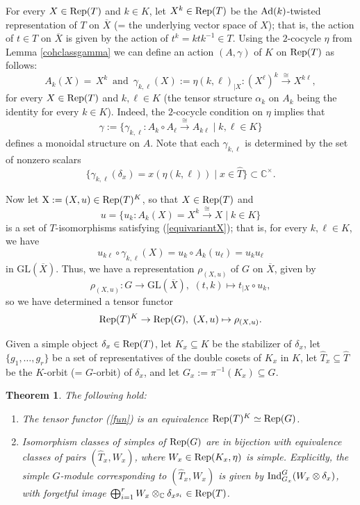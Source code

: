 \documentclass{amsart}
\newtheorem{theorem}{Theorem}[section]
\theoremstyle{definition}
\newcommand{\Ad}{{\rm Ad}}
\newcommand{\Rep}{{\rm Rep}}
\newcommand{\ot}{\otimes}
\newcommand{\GL}{{\text{GL}}}
\numberwithin{equation}{section}
\begin{document}
For every $X\in \Rep(T)$ and $ k\in K$, let $X^{ k}\in \Rep(T)$ be the $\Ad(k)$-twisted representation of $T$ on $\overline{X}$ (= the underlying vector space of $X$); that is, the action of $t\in T$ on $\overline{X}$ is given by the action of $t^k=ktk^{-1}\in T$. Using the $2$-cocycle $\eta$ from Lemma \ref{cohclassgamma} we can define an action $(A,\gamma)$ of $K$ on $\Rep(T)$ as follows: 
\begin{equation}\label{actionnew}
A_{{k}}(X)=\, X^{{k}}\,\,\,\text{and}\,\,\,\gamma_{{k},{\ell}}(X):=\eta(k,\ell)_{|X}:(X^{{\ell}})^{{k}}\xrightarrow{\cong} X^{{k\ell}},
\end{equation}
for every $X\in \Rep(T)$ and $k,\ell\in K$ (the tensor structure $\alpha_k$ on $A_k$ being the identity for every $k\in K$). Indeed, the $2$-cocycle condition on $\eta$ implies that 
$$\gamma:=\{\gamma_{k,\ell}:A_k\circ A_{\ell}\xrightarrow{\cong}A_{k\ell}\mid k,\ell\in K\}$$
defines a monoidal structure on $A$. Note that each $\gamma_{k,\ell}$ is determined by the set of nonzero scalars  
$$
\{\gamma_{{k},{\ell}}(\delta_{x})=x(\eta(k,\ell))\mid x\in\widehat{T}\}\subset\mathbb{C}^{\times}.
$$

Now let ${\rm X}:=(X,u)\in \Rep(T)^K$, so that $X\in \Rep(T)$ and 
$$u=\{u_{{k}}:A_{{k}}(X)=X^{{k}}\xrightarrow{\cong} X\mid k\in K\}$$ 
is a set of $T$-isomorphisms satisfying (\ref{equivariantX}); that is, for every $k,\ell\in K$, we have 
$$u_{{k}{\ell}}\circ \gamma_{{k},{\ell}}(X)=u_{{k}}\circ A_k(u_{{\ell}})=u_ku_{\ell}$$ 
in $\GL(\overline{X})$. Thus, we have a representation $\rho_{(X,u)}$ of $G$ on $\overline{X}$, given by
$$\rho_{(X,u)}:G\to \GL(\overline{X}),\,\,(t,{k})\mapsto t_{|X}\circ u_{{k}},$$
so we have determined a tensor functor
\begin{equation}\label{fun}
\Rep(T)^K\to \Rep(G),\,\,(X,u)\mapsto \rho_{(X,u)}.
\end{equation}

Given a simple object $\delta_x\in\Rep(T)$, let $K_x\subseteq K$ be the stabilizer of $\delta_x$, let $\{g_1,\dots,g_r\}$ be a set of representatives of the double cosets of $K_x$ in $K$, let $\widehat{T}_x\subseteq \widehat{T}$ be the $K$-orbit (= $G$-orbit) of $\delta_x$, and let $G_x:=\pi^{-1}(K_x)\subseteq G$.

\begin{theorem}\label{red2}
The following hold:
\begin{enumerate}
\item
The tensor functor (\ref{fun}) is an equivalence $\Rep(T)^K\simeq \Rep(G)$.
\item
Isomorphism classes of simples of ${\rm Rep}(G)$ are in bijection with equivalence classes of pairs $(\widehat{T}_x,W_x)$, where $W_x\in\Rep(K_x,\eta)$ is simple. 
Explicitly, the simple $G$-module corresponding to $(\widehat{T}_x,W_x)$ is given by ${\rm Ind}_{G_x}^G(W_x\ot \delta_x)$, with forgetful image 
$\bigoplus_{i=1}^r W_x\ot_{\mathbb{C}}\delta_{x^{g_i}}\in\Rep(T)$.
\end{enumerate}
\end{theorem}
\end{document}
